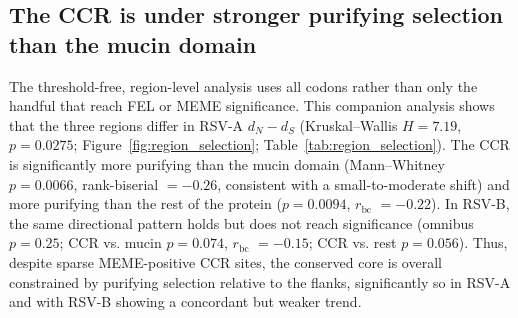 \documentclass[11pt]{article}
\newcommand{\dndsdiff}{\ensuremath{d_N-d_S}}
\newcommand{\rbc}{\ensuremath{r_{\mathrm{bc}}}}
\begin{document}
\begin{table}[H]
\centering
\scriptsize
\setlength{\tabcolsep}{3pt}
\caption{\textbf{FEL and MEME positive-site counts by region.} Counts are based on positive sites at unadjusted $p\leq0.05$ with RSV coordinates mapped to the RSV-A2 G reference where possible. Source data: \texttt{results/meme/summary\_meme\_region\_counts.csv}.}
\label{tab:meme_region_counts}
\end{table}

\subsection{The CCR is under stronger purifying selection than the mucin domain}\label{sec:region_result}

The threshold-free, region-level analysis uses all codons rather than only the handful that reach FEL or MEME significance. This companion analysis shows that the three regions differ in RSV-A \dndsdiff{} (Kruskal--Wallis $H=7.19$, $p=0.0275$; Figure~\ref{fig:region_selection}; Table~\ref{tab:region_selection}). The CCR is significantly more purifying than the mucin domain (Mann--Whitney $p=0.0066$, rank-biserial $=-0.26$, consistent with a small-to-moderate shift) and more purifying than the rest of the protein ($p=0.0094$, \rbc{} $=-0.22$). In RSV-B, the same directional pattern holds but does not reach significance (omnibus $p=0.25$; CCR vs. mucin $p=0.074$, \rbc{} $=-0.15$; CCR vs. rest $p=0.056$). Thus, despite sparse MEME-positive CCR sites, the conserved core is overall constrained by purifying selection relative to the flanks, significantly so in RSV-A and with RSV-B showing a concordant but weaker trend.
\end{document}
